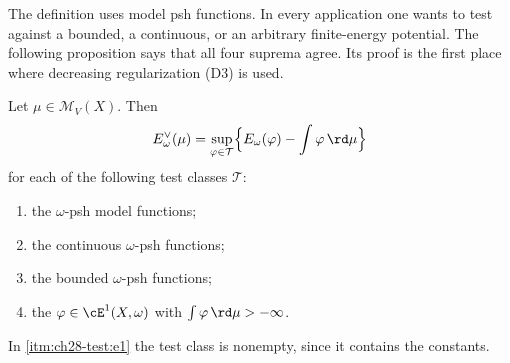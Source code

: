 The definition uses model psh functions.  In every application one wants to
test against a bounded, a continuous, or an arbitrary finite-energy
potential.  The following proposition says that all four suprema agree.  Its
proof is the first place where decreasing regularization
\textup{(D3)} is used.

\begin{proposition}
\label{prop:ch28-test-class}
Let $\mu\in\mathcal M_V(X)$.  Then
\begin{equation}
\label{eq:ch28-test-class}
 E^\vee_\omega(\mu)
 =\sup_{\varphi\in\mathcal T}
   \Bigl\{E_\omega(\varphi)-\int\varphi\,\rd\mu\Bigr\}
\end{equation}
for each of the following test classes $\mathcal T$:
\begin{enumerate}
\item\label{itm:ch28-test:model}
 the $\omega$-psh model functions;
\item\label{itm:ch28-test:cont}
 the continuous $\omega$-psh functions;
\item\label{itm:ch28-test:bdd}
 the bounded $\omega$-psh functions;
\item\label{itm:ch28-test:e1}
 the $\varphi\in\cE^1(X,\omega)$ with $\int\varphi\,\rd\mu>-\infty$.
\end{enumerate}
In \cref{itm:ch28-test:e1} the test class is nonempty, since it contains the
constants.
\end{proposition}

